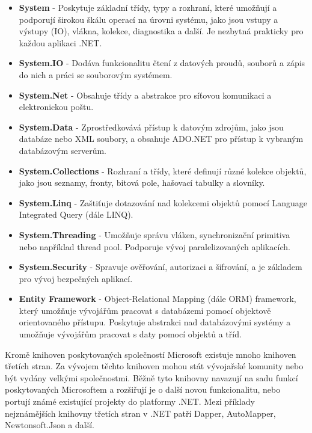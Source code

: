 \begin{itemize}
    \item \textbf{System} - Poskytuje základní třídy, typy a rozhraní, které umožňují a podporují širokou škálu operací na úrovni systému, jako jsou vstupy a výstupy (IO), vlákna, kolekce, diagnostika a další. Je nezbytná prakticky pro každou aplikaci .NET.
    \item \textbf{System.IO} - Dodáva funkcionalitu čtení z datových proudů, souborů a zápis do nich a práci se souborovým systémem.
    \item \textbf{System.Net} - Obsahuje třídy a abstrakce pro síťovou komunikaci a elektronickou poštu.
    \item \textbf{System.Data} - Zprostředkovává přístup k datovým zdrojům, jako jsou databáze nebo XML soubory, a obsahuje ADO.NET pro přístup k vybraným databázovým serverům.
    \item \textbf{System.Collections} - Rozhraní a třídy, které definují různé kolekce objektů, jako jsou seznamy, fronty, bitová pole, hašovací tabulky a slovníky.
    \item \textbf{System.Linq} - Zaštiťuje dotazování nad kolekcemi objektů pomocí Language Integrated Query (dále LINQ).
    \item \textbf{System.Threading} - Umožňuje správu vláken, synchronizační primitiva nebo například thread pool. Podporuje vývoj paralelizovaných aplikacích.
    \item \textbf{System.Security} - Spravuje ověřování, autorizaci a šifrování, a je základem pro vývoj bezpečných aplikací.
    \item \textbf{Entity Framework} - Object-Relational Mapping (dále ORM) framework, který umožňuje vývojářům pracovat s databázemi pomocí objektově orientovaného přístupu. Poskytuje abstrakci nad databázovými systémy a umožňuje vývojářům pracovat s daty pomocí objektů a tříd. \cite{netdocs}
\end{itemize}

Kromě knihoven poskytovaných společností Microsoft existuje mnoho knihoven třetích stran. Za vývojem těchto knihoven mohou stát vývojařské komunity nebo být vydány velkými společnostmi. Běžně tyto knihovny navazují na sadu funkcí poskytovaných Microsoftem a rozšiřují je o další novou funkcionalitu, nebo portují známé existující projekty do platformy .NET. Mezi příklady nejznámějších knihovny třetích stran v .NET patří Dapper, AutoMapper, Newtonsoft.Json a další.


